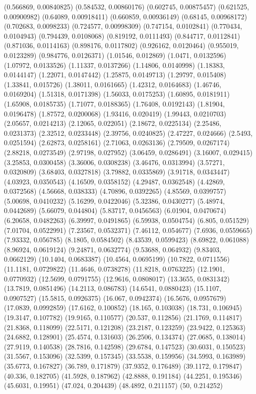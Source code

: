 {(0.566869, 0.00840825)
(0.584532, 0.00860176)
(0.602745, 0.00875457)
(0.621525, 0.00900982)
(0.64089, 0.00918411)
(0.660859, 0.00936149)
(0.68145, 0.00968172)
(0.702683, 0.0098233)
(0.724577, 0.00998309)
(0.747154, 0.0102841)
(0.770434, 0.0104943)
(0.794439, 0.0108068)
(0.819192, 0.0111493)
(0.844717, 0.0112841)
(0.871036, 0.0114163)
(0.898176, 0.0117802)
(0.926162, 0.0120464)
(0.955019, 0.0123289)
(0.984776, 0.0126371)
(1.01546, 0.012869)
(1.0471, 0.0132596)
(1.07972, 0.0133526)
(1.11337, 0.0137266)
(1.14806, 0.0140998)
(1.18383, 0.0144147)
(1.22071, 0.0147442)
(1.25875, 0.0149713)
(1.29797, 0.015408)
(1.33841, 0.015726)
(1.38011, 0.0161665)
(1.42312, 0.0164683)
(1.46746, 0.0169204)
(1.51318, 0.0171398)
(1.56033, 0.0175253)
(1.60895, 0.0181911)
(1.65908, 0.0185735)
(1.71077, 0.0188365)
(1.76408, 0.0192143)
(1.81904, 0.0196478)
(1.87572, 0.0200068)
(1.93416, 0.020419)
(1.99443, 0.0210703)
(2.05657, 0.0214213)
(2.12065, 0.022051)
(2.18672, 0.0225134)
(2.25486, 0.0231373)
(2.32512, 0.0233448)
(2.39756, 0.0240825)
(2.47227, 0.024666)
(2.5493, 0.0251594)
(2.62873, 0.0258161)
(2.71063, 0.0263136)
(2.79509, 0.0267174)
(2.88218, 0.0273549)
(2.97198, 0.027952)
(3.06459, 0.0286491)
(3.16007, 0.029415)
(3.25853, 0.0300458)
(3.36006, 0.0308238)
(3.46476, 0.0313994)
(3.57271, 0.0320809)
(3.68403, 0.0327818)
(3.79882, 0.0335869)
(3.91718, 0.0343447)
(4.03923, 0.0350543)
(4.16509, 0.0358152)
(4.29487, 0.0362548)
(4.42869, 0.0372568)
(4.56668, 0.038333)
(4.70896, 0.0392265)
(4.85569, 0.0399757)
(5.00698, 0.0410232)
(5.16299, 0.0422046)
(5.32386, 0.0430277)
(5.48974, 0.0442689)
(5.66079, 0.044804)
(5.83717, 0.0456563)
(6.01904, 0.0470674)
(6.20658, 0.0482263)
(6.39997, 0.0491865)
(6.59938, 0.0504754)
(6.805, 0.051529)
(7.01704, 0.0522991)
(7.23567, 0.0532371)
(7.46112, 0.054677)
(7.6936, 0.0559665)
(7.93332, 0.056785)
(8.1805, 0.0584502)
(8.43539, 0.0599423)
(8.69822, 0.061088)
(8.96924, 0.0619124)
(9.24871, 0.0632774)
(9.53688, 0.064932)
(9.83403, 0.0662129)
(10.1404, 0.0683387)
(10.4564, 0.0695199)
(10.7822, 0.0711556)
(11.1181, 0.0729822)
(11.4646, 0.0738278)
(11.8218, 0.0763225)
(12.1901, 0.0770932)
(12.5699, 0.0791755)
(12.9616, 0.0808017)
(13.3655, 0.0831342)
(13.7819, 0.0851496)
(14.2113, 0.086783)
(14.6541, 0.0880423)
(15.1107, 0.0907527)
(15.5815, 0.0926375)
(16.067, 0.0942374)
(16.5676, 0.0957679)
(17.0839, 0.0992859)
(17.6162, 0.100852)
(18.165, 0.103038)
(18.731, 0.106945)
(19.3147, 0.107782)
(19.9165, 0.110577)
(20.537, 0.112856)
(21.1769, 0.114817)
(21.8368, 0.118099)
(22.5171, 0.121208)
(23.2187, 0.123259)
(23.9422, 0.125363)
(24.6882, 0.128901)
(25.4574, 0.131603)
(26.2506, 0.134374)
(27.0685, 0.138014)
(27.9119, 0.140538)
(28.7816, 0.142598)
(29.6784, 0.147523)
(30.6031, 0.150523)
(31.5567, 0.153096)
(32.5399, 0.157345)
(33.5538, 0.159956)
(34.5993, 0.163989)
(35.6773, 0.167827)
(36.789, 0.171879)
(37.9352, 0.176489)
(39.1172, 0.179847)
(40.336, 0.182705)
(41.5928, 0.187962)
(42.8888, 0.191184)
(44.2251, 0.195346)
(45.6031, 0.19951)
(47.024, 0.204439)
(48.4892, 0.211157)
(50, 0.214252)
}

